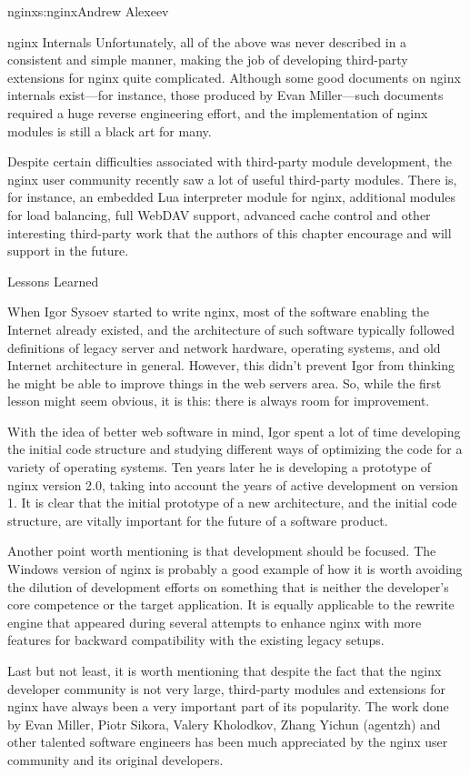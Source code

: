 \begin{aosachapter}{nginx}{s:nginx}{Andrew Alexeev}
\begin{aosasect1}{nginx Internals}
Unfortunately, all of the above was never described in a consistent and
simple manner, making the job of developing third-party extensions for
nginx quite complicated. Although some good documents on nginx
internals exist---for instance, those produced by Evan Miller---such
documents required a huge reverse engineering effort, and the
implementation of nginx modules is still a black art for many.

Despite certain difficulties associated with third-party module
development, the nginx user community recently saw a lot of useful
third-party modules. There is, for instance, an embedded Lua
interpreter module for nginx, additional modules for load balancing,
full WebDAV support, advanced cache control and other interesting
third-party work that the authors of this chapter encourage and will
support in the future.

\end{aosasect1}

\begin{aosasect1}{Lessons Learned}

When Igor Sysoev started to write nginx, most of the software enabling
the Internet already existed, and the architecture of such software
typically followed definitions of legacy server and network hardware,
operating systems, and old Internet architecture in general. However,
this didn't prevent Igor from thinking he might be able to improve
things in the web servers area. So, while the first lesson might seem
obvious, it is this: there is always room for improvement.

With the idea of better web software in mind, Igor spent
a lot of time developing the initial code structure and studying
different ways of optimizing the code for a variety of operating
systems.  Ten years later he is developing a prototype of nginx version 2.0,
taking into account the years of active development on version 1. 
It is clear that the initial
prototype of a new architecture, and the initial code structure, are vitally
important for the future of a software product.

Another point worth mentioning is that development should be
focused. The Windows version of nginx is probably a good example of
how it is worth avoiding the dilution of development efforts on
something that is neither the developer's core competence or the
target application. It is equally applicable to the rewrite engine
that appeared during several attempts to enhance nginx with more
features for backward compatibility with the existing legacy setups.

Last but not least, it is worth mentioning that despite the fact that
the nginx developer community is not very large, third-party modules
and extensions for nginx have always been a very important part of its
popularity. The work done by Evan Miller, Piotr Sikora, Valery
Kholodkov, Zhang Yichun (agentzh) and other talented software
engineers has been much appreciated by the nginx user community and
its original developers.

\end{aosasect1}

\end{aosachapter}
